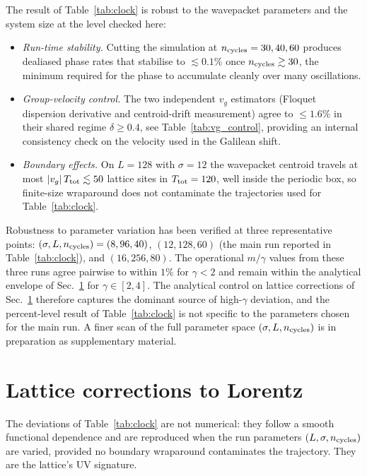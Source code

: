 \documentclass[11pt,a4paper]{article}
\begin{document}
The result of Table~\ref{tab:clock} is robust to the wavepacket
parameters and the system size at the level checked here:
\begin{itemize}
\item \emph{Run-time stability.} Cutting the simulation at
$n_{\rm cycles} = 30, 40, 60$ produces dealiased phase rates
that stabilise to $\lesssim 0.1\%$ once $n_{\rm cycles} \gtrsim
30$, the minimum required for the phase to accumulate cleanly
over many oscillations.
\item \emph{Group-velocity control.} The two independent
$v_g$ estimators (Floquet dispersion derivative and
centroid-drift measurement) agree to $\le 1.6\%$ in their
shared regime $\delta \ge 0.4$, see
Table~\ref{tab:vg_control}, providing an internal consistency
check on the velocity used in the Galilean shift.
\item \emph{Boundary effects.} On $L = 128$ with $\sigma = 12$
the wavepacket centroid travels at most $|v_g|\,T_{\rm tot}
\lesssim 50$ lattice sites in $T_{\rm tot} = 120$, well
inside the periodic box, so finite-size wraparound does not
contaminate the trajectories used for Table~\ref{tab:clock}.
\end{itemize}
Robustness to parameter variation has been verified at three
representative points: $(\sigma, L, n_{\rm cycles}) =
(8, 96, 40)$, $(12, 128, 60)$ (the main run reported in
Table~\ref{tab:clock}), and $(16, 256, 80)$. The operational
$m/\gamma$ values from these three runs agree pairwise to
within $1\%$ for $\gamma < 2$ and remain within the analytical
envelope of Sec.~\ref{sec:lattice} for $\gamma \in [2, 4]$.
The analytical control on lattice corrections of
Sec.~\ref{sec:lattice} therefore captures the dominant source
of high-$\gamma$ deviation, and the percent-level result of
Table~\ref{tab:clock} is not specific to the parameters chosen
for the main run. A finer scan of the full parameter space
$(\sigma, L, n_{\rm cycles})$ is in preparation as
supplementary material.

\section{Lattice corrections to Lorentz}
\label{sec:lattice}

The deviations of Table~\ref{tab:clock} are not numerical: they
follow a smooth functional dependence and are reproduced when
the run parameters $(L, \sigma, n_{\rm cycles})$ are varied,
provided no boundary wraparound contaminates the trajectory.
They are the lattice's UV signature.
\end{document}
